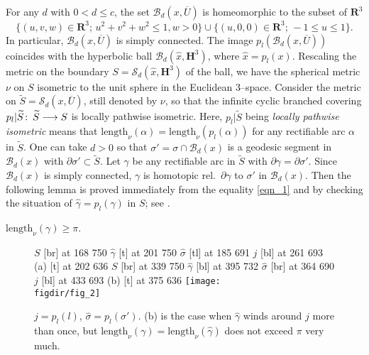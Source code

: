 \documentclass{gtart_a}
\theoremstyle{definition}
\numberwithin{equation}{section}
\begin{document}
For any $d$ with $0<d\leq c$, the set $\mathcal{B}_d(x,\overline U)$ is homeomorphic to the subset of $\mathbf{R}^3$
$$\{(u,v,w)\in \mathbf{R}^3;\, u^2+v^2+w^2\leq 1, w>0\}\cup \{(u,0,0)\in \mathbf{R}^3;\, -1\leq u\leq 1\}.$$
In particular, $\mathcal{B}_d(x,\overline U)$ is simply connected.
The image $p_l(\mathcal{B}_d(x,\overline U))$ coincides with the hyperbolic ball 
$\mathcal{B}_d(\hat x,\mathbf{H}^3)$, where $\hat x=p_l(x)$.
Rescaling the metric on the boundary $S=\mathcal{S}_d(\hat x,\mathbf{H}^3)$ of the ball, we have the spherical 
metric $\nu$ on $S$ isometric to the unit sphere in the Euclidean $3$--space.
Consider the metric on $\tilde S=\mathcal{S}_d(x,\overline U)$, still denoted by $\nu$, so that the infinite cyclic 
branched covering $p_l|\tilde S\co \tilde S\longrightarrow S$ is locally pathwise isometric.
Here, $p_l|\tilde S$ being \emph{locally pathwise isometric\/} means that 
$\mathrm{length}_\nu (\alpha)=\mathrm{length}_\nu(p_l(\alpha))$ for any rectifiable arc $\alpha$ in $\tilde S$.
One can take $d>0$ so that $\sigma'=\sigma\cap \mathcal{B}_d(x)$ is a geodesic segment in $\mathcal{B}_d(x)$ with 
$\partial \sigma'\subset \tilde S$.
Let $\gamma$ be any rectifiable arc in $\tilde S$ with $\partial \gamma=\partial \sigma'$.
Since $\mathcal{B}_d(x)$ is simply connected, $\gamma$ is homotopic rel.\ $\partial \gamma$ to $\sigma'$ in 
$\mathcal{B}_d(x)$.
Then the following lemma is proved immediately from the equality \eqref{eqn_1} and by checking the situation of 
$\hat \gamma=p_l(\gamma)$ in $S$; see .


\begin{lemma}\label{l_1}
$\mathrm{length}_\nu (\gamma)\geq \pi$.
\end{lemma}

\begin{figure}[ht!]
\small\hair 2pt
\pinlabel $S$ [br] at 168 750 
\pinlabel $\hat \gamma$ [t] at 201 750
\pinlabel $\hat \sigma$ [tl] at 185 691 
\pinlabel $j$ [bl] at 261 693 
\pinlabel (a) [t] at 202 636
\pinlabel $S$ [br] at 339 750
\pinlabel $\hat \gamma$ [bl] at 395 732 
\pinlabel $\hat \sigma$ [br] at 364 690 
\pinlabel $j$ [bl] at 433 693 
\pinlabel (b) [t] at 375 636
\endlabellist 
\centering
\texttt{[image: \\figdir/fig\_2]}
\caption{$j=p_l(l)$, $\hat \sigma=p_l(\sigma')$.
(b) is the case when $\hat \gamma$ winds around $j$ more than once, but 
$\mathrm{length}_\nu (\gamma)=\mathrm{length}_\nu (\hat \gamma)$ does not exceed $\pi$ very much.}
\label{f_2}
\end{figure}
\end{document}
